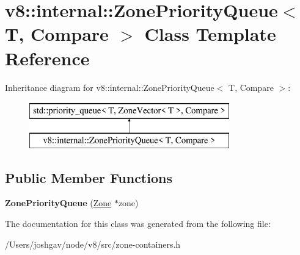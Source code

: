 \hypertarget{classv8_1_1internal_1_1_zone_priority_queue}{}\section{v8\+:\+:internal\+:\+:Zone\+Priority\+Queue$<$ T, Compare $>$ Class Template Reference}
\label{classv8_1_1internal_1_1_zone_priority_queue}
Inheritance diagram for v8\+:\+:internal\+:\+:Zone\+Priority\+Queue$<$ T, Compare $>$\+:\begin{figure}[H]
\begin{center}
\leavevmode
\includegraphics[height=2.000000cm]{classv8_1_1internal_1_1_zone_priority_queue}
\end{center}
\end{figure}
\subsection*{Public Member Functions}
\begin{DoxyCompactItemize}
\item 
{\bfseries Zone\+Priority\+Queue} (\hyperlink{classv8_1_1internal_1_1_zone}{Zone} $\ast$zone)\hypertarget{classv8_1_1internal_1_1_zone_priority_queue_aa93008febe3107a1fca2e37141abaf05}{}\label{classv8_1_1internal_1_1_zone_priority_queue_aa93008febe3107a1fca2e37141abaf05}

\end{DoxyCompactItemize}


The documentation for this class was generated from the following file\+:\begin{DoxyCompactItemize}
\item 
/\+Users/joshgav/node/v8/src/zone-\/containers.\+h\end{DoxyCompactItemize}
